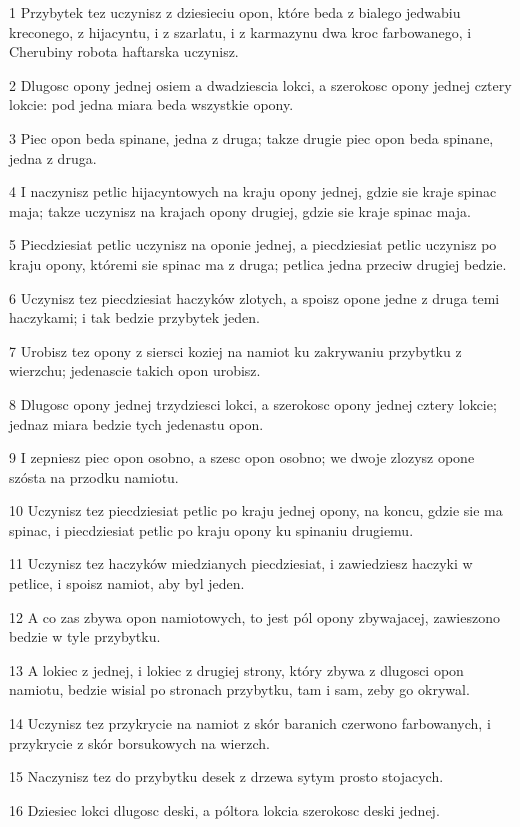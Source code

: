 \par 1 Przybytek tez uczynisz z dziesieciu opon, które beda z bialego jedwabiu kreconego, z hijacyntu, i z szarlatu, i z karmazynu dwa kroc farbowanego, i Cherubiny robota haftarska uczynisz.
\par 2 Dlugosc opony jednej osiem a dwadziescia lokci, a szerokosc opony jednej cztery lokcie: pod jedna miara beda wszystkie opony.
\par 3 Piec opon beda spinane, jedna z druga; takze drugie piec opon beda spinane, jedna z druga.
\par 4 I naczynisz petlic hijacyntowych na kraju opony jednej, gdzie sie kraje spinac maja; takze uczynisz na krajach opony drugiej, gdzie sie kraje spinac maja.
\par 5 Piecdziesiat petlic uczynisz na oponie jednej, a piecdziesiat petlic uczynisz po kraju opony, któremi sie spinac ma z druga; petlica jedna przeciw drugiej bedzie.
\par 6 Uczynisz tez piecdziesiat haczyków zlotych, a spoisz opone jedne z druga temi haczykami; i tak bedzie przybytek jeden.
\par 7 Urobisz tez opony z siersci koziej na namiot ku zakrywaniu przybytku z wierzchu; jedenascie takich opon urobisz.
\par 8 Dlugosc opony jednej trzydziesci lokci, a szerokosc opony jednej cztery lokcie; jednaz miara bedzie tych jedenastu opon.
\par 9 I zepniesz piec opon osobno, a szesc opon osobno; we dwoje zlozysz opone szósta na przodku namiotu.
\par 10 Uczynisz tez piecdziesiat petlic po kraju jednej opony, na koncu, gdzie sie ma spinac, i piecdziesiat petlic po kraju opony ku spinaniu drugiemu.
\par 11 Uczynisz tez haczyków miedzianych piecdziesiat, i zawiedziesz haczyki w petlice, i spoisz namiot, aby byl jeden.
\par 12 A co zas zbywa opon namiotowych, to jest pól opony zbywajacej, zawieszono bedzie w tyle przybytku.
\par 13 A lokiec z jednej, i lokiec z drugiej strony, który zbywa z dlugosci opon namiotu, bedzie wisial po stronach przybytku, tam i sam, zeby go okrywal.
\par 14 Uczynisz tez przykrycie na namiot z skór baranich czerwono farbowanych, i przykrycie z skór borsukowych na wierzch.
\par 15 Naczynisz tez do przybytku desek z drzewa sytym prosto stojacych.
\par 16 Dziesiec lokci dlugosc deski, a póltora lokcia szerokosc deski jednej.
